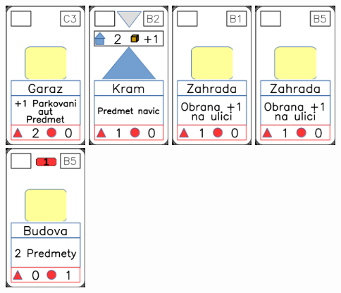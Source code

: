 \documentclass[a4paper]{article}
\begin{document}
	\includegraphics[width=3.0cm]{img-2_12}
	\includegraphics[width=3.0cm]{img-3_6}
	\includegraphics[width=3.0cm]{img-2_20}
	\includegraphics[width=3.0cm]{img-2_24}
	\includegraphics[width=3.0cm]{img-2_9}
\end{document}
